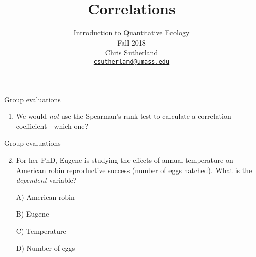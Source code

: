 \documentclass[
  ignorenonframetext,
  t]{beamer}
\title{Correlations}
\author{Introduction to Quantitative Ecology\\
Fall 2018\\
Chris Sutherland\\
\href{mailto:csutherland@umass.edu}{\nolinkurl{csutherland@umass.edu}}}
\date{}
\providecommand{\tightlist}{%
  \setlength{\itemsep}{0pt}\setlength{\parskip}{0pt}}
\begin{document}
\frame{\titlepage}

\begin{frame}{Group evaluations}
\protect\hypertarget{group-evaluations}{}

\begin{enumerate}
\tightlist
\item
  We would \emph{not} use the Spearman's rank test to calculate a
  correlation coefficient - which one?
\end{enumerate}

\scriptsize



\end{frame}

\begin{frame}{Group evaluations}
\protect\hypertarget{group-evaluations-1}{}

\begin{enumerate}
\setcounter{enumi}{1}
\tightlist
\item
  For her PhD, Eugene is studying the effects of annual temperature on
  American robin reproductive success (number of eggs hatched). What is
  the \emph{dependent} variable?
\end{enumerate}

\begin{enumerate}[\hspace{0.5cm}A.]
  \item[A)] American robin
  \item[B)] Eugene
  \item[C)] Temperature
  \item[D)] Number of eggs
\end{enumerate}


\end{frame}
\end{document}
